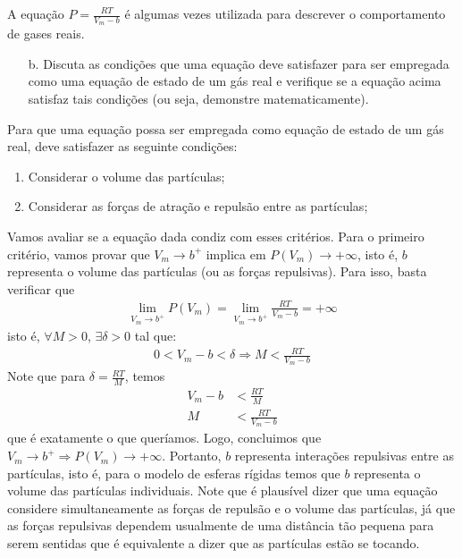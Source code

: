 \begin{xcs}
    A equação \( P = \frac{RT}{V_m - b} \) é algumas vezes utilizada para
    descrever o comportamento de gases reais. 
    \begin{enumerate}[label=\alph*.]
        \item[b.] Discuta as condições que uma equação deve satisfazer para ser
            empregada como uma equação de estado de um gás real e verifique se a
            equação acima satisfaz tais condições (ou seja, demonstre
            matematicamente). 
    \end{enumerate}
\end{xcs}
\begin{rsl}
    Para que uma equação possa ser empregada como equação de estado de um gás real,
    deve satisfazer as seguinte condições:
    \begin{enumerate}
        \item Considerar o volume das partículas;
        \item Considerar as forças de atração e repulsão entre as partículas;
    \end{enumerate}
    Vamos avaliar se a equação dada condiz com esses critérios. Para o primeiro
    critério, vamos
    provar que \( V_m \to b^+ \) implica em \( P(V_m) \to +\infty \), isto é, \(
    b\) representa o volume das partículas (ou as forças repulsivas).
    Para isso, basta verificar que 
    \begin{align*}
        \lim_{V_m \to b^+} P(V_m) = \lim_{V_m \to b^+} \frac{RT}{V_m-b} = +\infty
    \end{align*}
    isto é, \( \forall M > 0 \), \( \exists \delta > 0 \) tal que:
    \begin{align*}
        0 < V_m - b < \delta \Rightarrow M < \frac{RT}{V_m-b}
    \end{align*}
    Note que para \( \delta = \frac{RT}{M} \), temos
    \begin{align*}
        V_m - b &< \frac{RT}{M}\\
        M &< \frac{RT}{V_m - b} 
    \end{align*}
    que é exatamente o que queríamos. Logo, concluimos que \( V_m \to b^+
    \Rightarrow P(V_m) \to +\infty \). Portanto, \( b \) representa interações
    repulsivas entre as partículas, isto é, para o modelo de esferas rígidas
    temos que \( b \) representa o volume das partículas individuais. Note que é
    plausível dizer que uma equação considere simultaneamente as forças de
    repulsão e o volume das partículas, já que as forças repulsivas dependem
    usualmente de uma distância tão pequena para serem sentidas que é
    equivalente a dizer que as partículas estão se tocando. 


\end{rsl}
